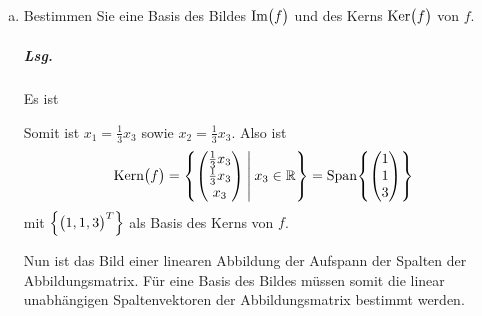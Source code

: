 \documentclass{scrreprt}
\begin{document}
\begin{enumerate}[(a)]
\item \label{7_4_a} Bestimmen Sie eine Basis des Bildes $\text{Im}\qty\big(f)$
  und des Kerns $\text{Ker}\qty\big(f)$ von $f$.

  \subparagraph{Lsg.} Es ist
  Somit ist $x_1 = \frac{1}{3}x_3$ sowie $x_2 = \frac{1}{3}x_3$.
  Also ist
  \[
    \text{Kern}\qty\big(f) = \qty{
      \begin{pmatrix}
        \frac{1}{3}x_3 \\
        \frac{1}{3}x_3 \\
        x_3 \\
      \end{pmatrix}
      \:\middle|\:
      x_3 \in \mathbb{R}
    } = \text{Span}\qty{\begin{pmatrix}
        1 \\
        1 \\
        3 \\
      \end{pmatrix}}
  \]
  mit $\qty{\qty\big(1, 1, 3)^T}$ als Basis des Kerns von $f$.

  Nun ist das Bild einer linearen Abbildung der Aufspann der Spalten der
  Abbildungsmatrix.
  Für eine Basis des Bildes müssen somit die linear unabhängigen
  Spaltenvektoren der Abbildungsmatrix bestimmt werden.


\end{enumerate}
\end{document}
